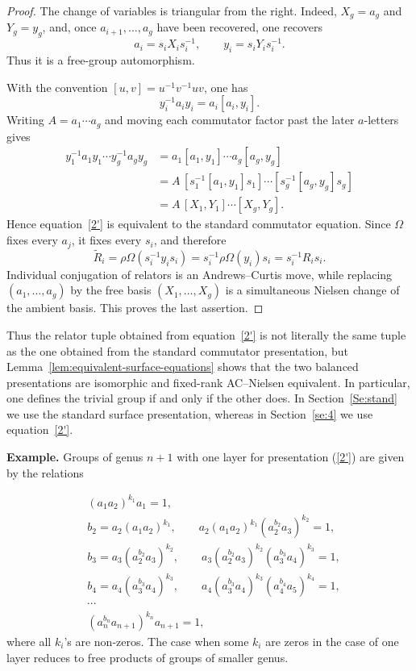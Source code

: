 \documentclass{article}
\begin{document}
\begin{proof}
The change of variables is triangular from the right.  Indeed,
$X_g=a_g$ and $Y_g=y_g$, and, once $a_{i+1},\ldots,a_g$ have been recovered,
one recovers
\[
 a_i=s_iX_i s_i^{-1},
 \qquad
 y_i=s_iY_i s_i^{-1}.
\]
Thus it is a free-group automorphism.

With the convention $[u,v]=u^{-1}v^{-1}uv$, one has
\[
 y_i^{-1}a_i y_i=a_i[a_i,y_i].
\]
Writing $A=a_1\cdots a_g$ and moving each commutator factor past the later
$a$-letters gives
\[
 \begin{aligned}
 y_1^{-1}a_1y_1\cdots y_g^{-1}a_gy_g
 &=a_1[a_1,y_1]\cdots a_g[a_g,y_g]\\
 &=A\,[s_1^{-1}[a_1,y_1]s_1]\cdots
       [s_g^{-1}[a_g,y_g]s_g]\\
 &=A\,[X_1,Y_1]\cdots[X_g,Y_g].
 \end{aligned}
\]
Hence equation~\eqref{2'} is equivalent to the standard commutator equation.
Since $\Omega$ fixes every $a_j$, it fixes every $s_i$, and therefore
\[
 \widetilde R_i
 =\rho\Omega(s_i^{-1}y_i s_i)
 =s_i^{-1}\rho\Omega(y_i)s_i
 =s_i^{-1}R_i s_i.
\]
Individual conjugation of relators is an Andrews--Curtis move, while replacing
$(a_1,\ldots,a_g)$ by the free basis $(X_1,\ldots,X_g)$ is a simultaneous
Nielsen change of the ambient basis.  This proves the last assertion.
\end{proof}

Thus the relator tuple obtained from equation~\eqref{2'} is not literally the
same tuple as the one obtained from the standard commutator presentation, but
Lemma~\ref{lem:equivalent-surface-equations} shows that the two balanced
presentations are isomorphic and fixed-rank AC--Nielsen equivalent.  In
particular, one defines the trivial group if and only if the other does.  In
Section~\ref{Se:stand} we use the standard surface presentation, whereas in
Section~\ref{se:4} we use equation~\eqref{2'}.

{\bf Example.} Groups of genus \(n+1\) with one layer for presentation (\ref{2'}) are given by the relations

\begin{equation}\label{eq:6}
\begin{aligned}
&(a_1a_2)^{k_1}a_1=1,\\
&b_2=a_2(a_1a_2)^{k_1},\qquad
  a_2(a_1a_2)^{k_1}(a_2^{b_2}a_3)^{k_2}=1,\\
&b_3=a_3(a_2^{b_2}a_3)^{k_2},\qquad
  a_3(a_2^{b_2}a_3)^{k_2}(a_3^{b_3}a_4)^{k_3}=1,\\
&b_4=a_4(a_3^{b_3}a_4)^{k_3},\qquad
  a_4(a_3^{b_3}a_4)^{k_3}(a_4^{b_4}a_5)^{k_4}=1,\\
& \cdots \\
&(a_{n}^{b_{n}}a_{n+1})^{k_{n}}a_{n+1}=1,
\end{aligned}
\end{equation} where all $k_i$'s are non-zeros. The case when some $k_i$ are  zeros in the case of one layer reduces to free products of groups of smaller genus.  
\end{document}

